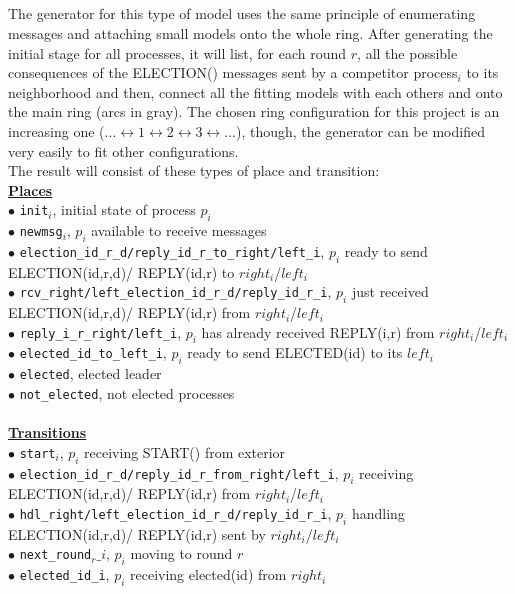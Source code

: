 \documentclass{article}
\begin{document}
	\subparagraph{}The generator for this type of model uses the same principle of enumerating messages and attaching small models onto the whole ring. After generating the initial stage for all processes, it will list, for each round $r$, all the possible consequences of the ELECTION() messages sent by a competitor process$_i$ to its neighborhood and then, connect all the fitting models with each others and onto the main ring (arcs in gray). The chosen ring configuration for this project is an increasing one ($... \leftrightarrow 1 \leftrightarrow 2 \leftrightarrow 3 \leftrightarrow ...$), though, the generator can be modified very easily to fit other configurations.
	\\The result will consist of these types of place and transition:
	\\\textbf{\underline{Places}}
	\\$\bullet$ \texttt{init$_{i}$}, initial state of process $p_i$
	\\$\bullet$ \texttt{newmsg$_{i}$}, $p_i$ available to receive messages
	\\$\bullet$ \texttt{election\_id\_r\_d/reply\_id\_r\_to\_right/left\_i}, $p_i$ ready to send ELECTION(id,r,d)/ REPLY(id,r) to $right_i$/$left_i$
	\\$\bullet$ \texttt{rcv\_right/left\_election\_id\_r\_d/reply\_id\_r\_i}, $p_i$ just received ELECTION(id,r,d)/ REPLY(id,r) from $right_i$/$left_i$
	\\$\bullet$ \texttt{reply\_i\_r\_right/left\_i}, $p_i$ has already received REPLY(i,r) from $right_i$/$left_i$	
	\\$\bullet$ \texttt{elected\_id\_to\_left\_i}, $p_i$ ready to send ELECTED(id) to its $left_i$
	\\$\bullet$ \texttt{elected}, elected leader
	\\$\bullet$ \texttt{not\_elected}, not elected processes
	\\\\\textbf{\underline{Transitions}}
	\\$\bullet$ \texttt{start$_{i}$}, $p_i$ receiving START() from exterior
	\\$\bullet$ \texttt{election\_id\_r\_d/reply\_id\_r\_from\_right/left\_i}, $p_i$ receiving ELECTION(id,r,d)/ REPLY(id,r) from $right_i$/$left_i$
	\\$\bullet$ \texttt{hdl\_right/left\_election\_id\_r\_d/reply\_id\_r\_i}, $p_i$ handling ELECTION(id,r,d)/ REPLY(id,r) sent by $right_i$/$left_i$
	\\$\bullet$ \texttt{next\_round$_{r}\_i$}, $p_i$ moving to round $r$
	\\$\bullet$ \texttt{elected\_id\_i}, $p_i$ receiving elected(id) from $right_i$
\end{document}
